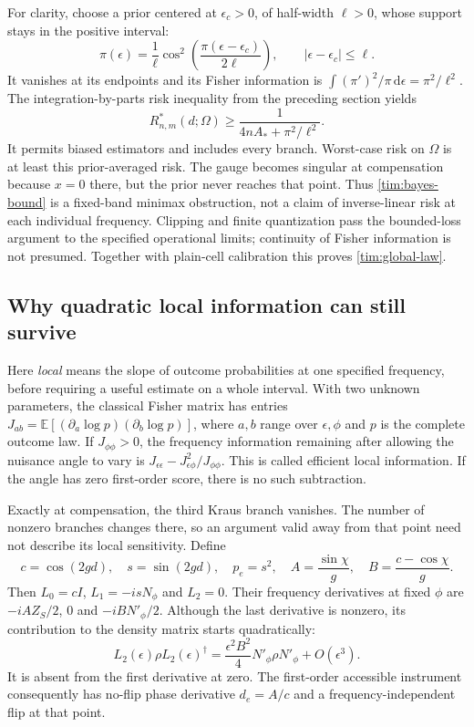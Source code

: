 \documentclass[11pt,a4paper]{article}
\numberwithin{equation}{section}
\theoremstyle{remark}
\newcommand{\dd}{\mathrm d}
\newcommand{\E}{\mathbb E}
\begin{document}
For clarity, choose a prior centered at $\epsilon_c>0$, of half-width
$\ell>0$, whose support stays in the positive interval:
\begin{equation}
 \pi(\epsilon)=\frac1\ell
 \cos^2\!\left(\frac{\pi(\epsilon-\epsilon_c)}{2\ell}\right),
 \qquad |\epsilon-\epsilon_c|\le\ell.
\end{equation}
It vanishes at its endpoints and its Fisher information is
$\int(\pi')^2/\pi\,\dd\epsilon=\pi^2/\ell^2$.
The integration-by-parts risk inequality from the preceding section yields
\begin{equation}
 R^*_{n,m}(d;\Omega)\ge
 \frac1{4nA_*+\pi^2/\ell^2}.
 \label{tim:bayes-bound}
\end{equation}
It permits biased estimators and includes every branch. Worst-case risk
on $\Omega$ is at least this prior-averaged risk. The gauge becomes singular
at compensation because $x=0$ there, but the prior never reaches that point.
Thus \eqref{tim:bayes-bound} is a fixed-band minimax obstruction, not a
claim of inverse-linear risk at each individual frequency. Clipping and
finite quantization pass the bounded-loss argument to the specified
operational limits; continuity of Fisher information is not presumed.
Together with plain-cell calibration this proves \eqref{tim:global-law}.

\subsection{Why quadratic local information can still survive}

Here \emph{local} means the slope of outcome probabilities at one specified
frequency, before requiring a useful estimate on a whole interval.
With two unknown parameters, the classical Fisher matrix has entries
$J_{ab}=\E[(\partial_a\log p)(\partial_b\log p)]$, where
$a,b$ range over $\epsilon,\phi$ and $p$ is the complete outcome law.
If $J_{\phi\phi}>0$, the frequency information remaining after allowing
the nuisance angle to vary is
$J_{\epsilon\epsilon}-J_{\epsilon\phi}^2/J_{\phi\phi}$.
This is called efficient local information. If the angle has zero
first-order score, there is no such subtraction.

Exactly at compensation, the third Kraus branch vanishes. The number
of nonzero branches changes there, so an argument valid away from
that point need not describe its local sensitivity. Define
\begin{equation}
 c=\cos(2gd),\quad s=\sin(2gd),\quad
 p_e=s^2,\quad A=\frac{\sin\chi}{g},\quad
 B=\frac{c-\cos\chi}{g}.
\end{equation}
Then $L_0=cI$, $L_1=-isN_\phi$ and $L_2=0$. Their frequency derivatives
at fixed $\phi$ are $-iAZ_S/2$, $0$ and $-iBN'_\phi/2$.
Although the last derivative is nonzero, its contribution to the density
matrix starts quadratically:
\begin{equation}
 L_2(\epsilon)\rho L_2(\epsilon)^\dagger
 =\frac{\epsilon^2B^2}{4}N'_\phi\rho N'_\phi+O(\epsilon^3).
\end{equation}
It is absent from the first derivative at zero. The first-order accessible
instrument consequently has no-flip phase derivative $d_e=A/c$ and a
frequency-independent flip at that point.
\end{document}
